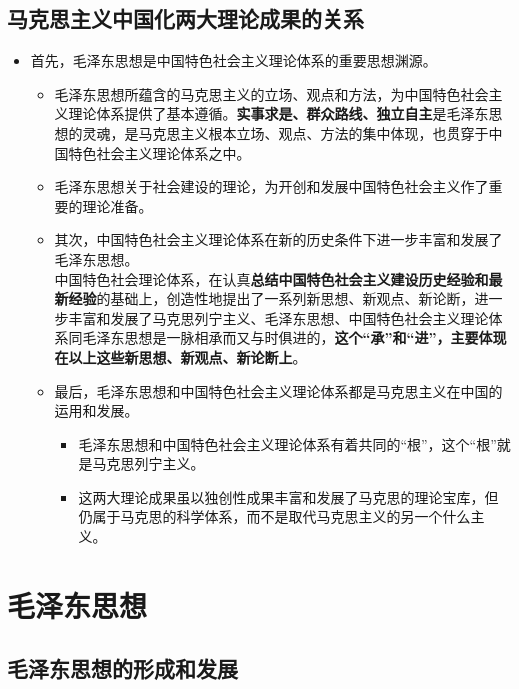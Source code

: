 \subsection{马克思主义中国化两大理论成果的关系}
\begin{itemize}
	\item 首先，毛泽东思想是中国特色社会主义理论体系的重要思想渊源。
	\begin{itemize}
		\item 毛泽东思想所蕴含的马克思主义的立场、观点和方法，为中国特色社会主义理论体系提供了基本遵循。\textbf{实事求是、群众路线、独立自主}是毛泽东思想的灵魂，是马克思主义根本立场、观点、方法的集中体现，也贯穿于中国特色社会主义理论体系之中。
		\item 毛泽东思想关于社会建设的理论，为开创和发展中国特色社会主义作了重要的理论准备。
		\item 其次，中国特色社会主义理论体系在新的历史条件下进一步丰富和发展了毛泽东思想。\\
		中国特色社会理论体系，在认真\textbf{总结中国特色社会主义建设历史经验和最新经验}的基础上，创造性地提出了一系列新思想、新观点、新论断，进一步丰富和发展了马克思列宁主义、毛泽东思想、中国特色社会主义理论体系同毛泽东思想是一脉相承而又与时俱进的，\textbf{这个“承”和“进”，主要体现在以上这些新思想、新观点、新论断上}。
		\item 最后，毛泽东思想和中国特色社会主义理论体系都是马克思主义在中国的运用和发展。
		\begin{itemize}
			\item 毛泽东思想和中国特色社会主义理论体系有着共同的“根”，这个“根”就是马克思列宁主义。
			\item 这两大理论成果虽以独创性成果丰富和发展了马克思的理论宝库，但仍属于马克思的科学体系，而不是取代马克思主义的另一个什么主义。
		\end{itemize}
	\end{itemize}
\end{itemize} 
\section{毛泽东思想}
\subsection{毛泽东思想的形成和发展}

